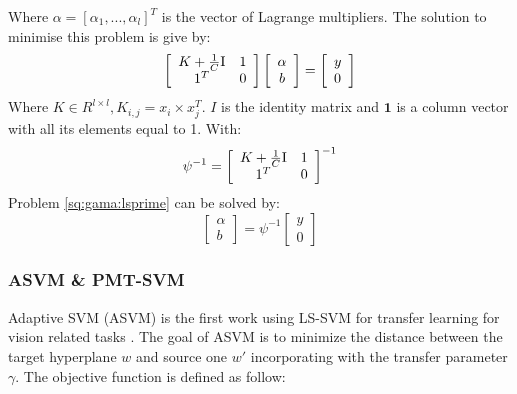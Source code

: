 Where $\alpha = [ \alpha_1,...,\alpha_l]^T $ is the vector of Lagrange multipliers. The solution to minimise this problem is give by:
\begin{equation}\label{eq:single:orgmatrix}
  \left[ {\begin{array}{*{20}{c}}
{K  + \frac{1}{C}{\rm I}}\\
1^T
\end{array}\begin{array}{*{20}{c}}
1\\
0
\end{array}} \right]\left[ {\begin{array}{*{20}{c}}
\alpha \\
b
\end{array}} \right] = \left[ \begin{array}{l}
y\\
0
\end{array} \right]
\end{equation}
Where $K \in R^{l \times l},K_{i,j}=x_i \times x_j^T$. $I$ is the identity matrix and $\mathbf{1}$ is a column vector with all its elements equal to 1. With:
\begin{equation}\label{eq:gama:psi}
\psi^{-1} = \left[ {\begin{array}{*{20}{c}}
{K  + \frac{1}{C}{\rm I}}\\
1^T
\end{array}\begin{array}{*{20}{c}}
1\\
0
\end{array}} \right]^{-1}
\end{equation}
Problem \eqref{sq:gama:lsprime} can be solved by:
\begin{equation}
\left[ {\begin{array}{*{20}{c}}
\alpha \\
b
\end{array}} \right] = \psi^{-1}\left[ \begin{array}{l}
y\\
0
\end{array} \right]
\end{equation}

\subsubsection{ASVM \& PMT-SVM}

Adaptive SVM (ASVM) is the first work using LS-SVM for transfer learning for vision related tasks \cite{yang2007adapting}. The goal of ASVM is to minimize the distance between the target hyperplane $w$ and source one $w'$ incorporating with the transfer parameter $\gamma$. The objective function is defined as follow:

